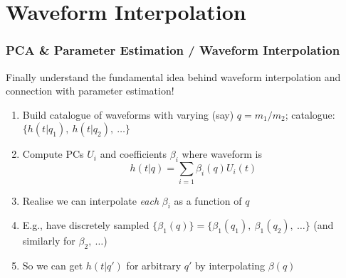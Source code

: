 \documentclass{beamer}
\begin{document}
\section{Waveform Interpolation}

\begin{frame}
    \frametitle{PCA \& Parameter Estimation / Waveform Interpolation}
    Finally understand the fundamental idea behind waveform interpolation and
    connection with parameter estimation!
    \begin{enumerate}
        \item Build catalogue of waveforms with varying (say) $q=m_1/m_2$;
            catalogue: $\{h(t|q_1),~h(t|q_2),~\dots\}$
        \item Compute PCs $U_i$ and coefficients $\beta_i$ where waveform is
            \begin{equation}
                h(t|q) = \sum_{i=1} \beta_i(q) U_i(t)
            \end{equation}
        \item Realise we can interpolate \emph{each} $\beta_i$ as a function of
            $q$
        \item E.g., have discretely sampled $\{\beta_1(q)\} = \{\beta_1(q_1),~
            \beta_1(q_2),~\dots\}$ (and similarly for $\beta_2,~\dots$)
        \item So we can get $h(t|q')$ for arbitrary $q'$ by interpolating
            $\beta(q)$
    \end{enumerate}

\end{frame}
\end{document}
